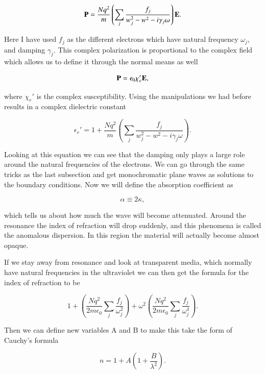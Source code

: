\documentclass[preprint, review,12pt]{elsarticle}
\def\b{\textbf}
\def\={\equiv}
\def\9{\left(}
\def\0{\right)}
\begin{document}
\begin{equation}
    \b P = \frac{Nq^2}{m} \9 \sum_j \frac{f_j}{w_j^2 - w^2 - i \gamma_j \omega} \0 \b E.
\end{equation}

Here I have used $f_j$ as the different electrons which have natural frequency $\omega_j$, and damping $\gamma_j$. This complex polarization is proportional to the complex field which allows us to define it through the normal means as well

\begin{equation}
    \b P = \epsilon_0 \chi_e' \b E,
\end{equation}

where $\chi_e'$ is the complex susceptibility. Using the manipulations we had before results in a complex dielectric constant

\begin{equation}
    \epsilon_r' = 1 + \frac{Nq^2}{m} \9 \sum_j \frac{f_j}{w_j^2 - w^2 - i \gamma_j \omega} \0.
\end{equation}

Looking at this equation we can see that the damping only plays a large role around the natural frequencies of the electrons. We can go through the same tricks as the last subsection and get monochromatic plane waves as solutions to the boundary conditions. Now we will define the absorption coefficient as 

\begin{equation}
    \alpha \= 2 \kappa,
\end{equation}

which tells us about how much the wave will become attenuated. Around the resonance the index of refraction will drop suddenly, and this phenomena is called the anomalous dispersion. In this region the material will actually become almost opaque.

If we stay away from resonance and look at transparent media, which normally have natural frequencies in the ultraviolet we can then get the formula for the index of refraction to be 

\begin{equation}
    1 + \9 \frac{Nq^2}{2m\epsilon_0} \sum_j \frac{f_j}{\omega_j^2} \0  + \omega^2 \9 \frac{Nq^2}{2m\epsilon_0} \sum_j \frac{f_j}{\omega_j^4} \0.
\end{equation}

Then we can define new variables A and B to make this take the form of Cauchy's formula

\begin{equation}
    n = 1 + A \9 1 + \frac{B}{\lambda^2} \0.
\end{equation}
\end{document}

